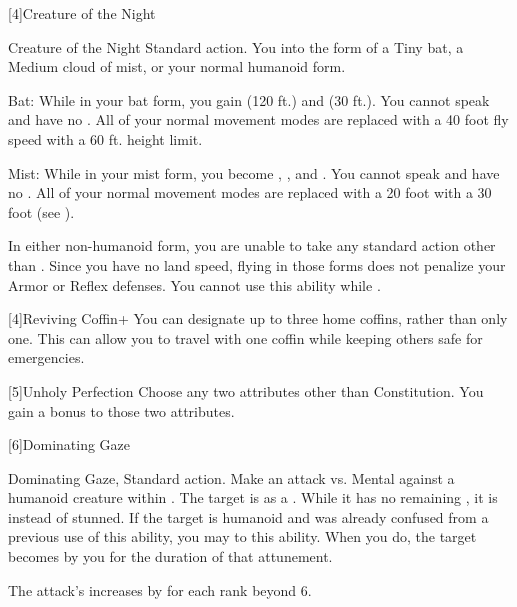       [4]{Creature of the Night}
      \begin{magicalattuneability}{Creature of the Night}{}
        \abilityusagetime Standard action.
        \rankline
        You  into the form of a Tiny bat, a Medium cloud of mist, or your normal humanoid form.
        \begin{raggeditemize}
          \item Bat: While in your bat form, you gain  (120 ft.) and  (30 ft.).
            You cannot speak and have no .
            All of your normal movement modes are replaced with a 40 foot fly speed with a 60 ft. height limit.
          \item Mist: While in your mist form, you become , , and .
            You cannot speak and have no .
            All of your normal movement modes are replaced with a 20 foot  with a 30 foot  (see ).
        \end{raggeditemize}

        In either non-humanoid form, you are unable to take any standard action other than .
        Since you have no land speed, flying in those forms does not penalize your Armor or Reflex defenses.
        You cannot use this ability while \paralyzed.
      \end{magicalattuneability}

      [4]{Reviving Coffin+} You can designate up to three home coffins, rather than only one.
      This can allow you to travel with one coffin while keeping others safe for emergencies.

    [5]{Unholy Perfection} Choose any two attributes other than Constitution.
      You gain a  bonus to those two attributes.

      [6]{Dominating Gaze}
      \begin{magicalactiveability}{Dominating Gaze}{, }
        \abilityusagetime Standard action.
        \rankline
        Make an attack vs. Mental against a humanoid creature within \shortrange.
        \hit The target is \stunned as a .
        While it has no remaining , it is \confused instead of stunned.
        \crit If the target is humanoid and was already confused from a previous use of this ability, you may  to this ability.
        When you do, the target becomes \dominated by you for the duration of that attunement.

        \rankline
        The attack's  increases by  for each rank beyond 6.
      \end{magicalactiveability}

